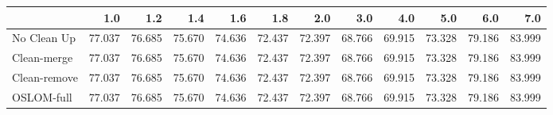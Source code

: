 \begin{tabular}{lrrrrrrrrrrr}
\toprule
{} &    1.0 &    1.2 &    1.4 &    1.6 &    1.8 &    2.0 &    3.0 &    4.0 &    5.0 &    6.0 &    7.0 \\
\midrule
No Clean Up  & 77.037 & 76.685 & 75.670 & 74.636 & 72.437 & 72.397 & 68.766 & 69.915 & 73.328 & 79.186 & 83.999 \\
Clean-merge  & 77.037 & 76.685 & 75.670 & 74.636 & 72.437 & 72.397 & 68.766 & 69.915 & 73.328 & 79.186 & 83.999 \\
Clean-remove & 77.037 & 76.685 & 75.670 & 74.636 & 72.437 & 72.397 & 68.766 & 69.915 & 73.328 & 79.186 & 83.999 \\
OSLOM-full   & 77.037 & 76.685 & 75.670 & 74.636 & 72.437 & 72.397 & 68.766 & 69.915 & 73.328 & 79.186 & 83.999 \\
\bottomrule
\end{tabular}

